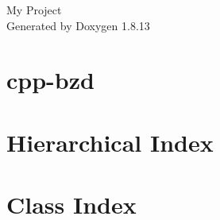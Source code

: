\documentclass[twoside]{book}
\newcommand{\+}{\discretionary{\mbox{\scriptsize$\hookleftarrow$}}{}{}}
\newcommand{\clearemptydoublepage}{%
  \newpage{\pagestyle{empty}\cleardoublepage}%
}
\begin{document}
\hypersetup{pageanchor=false,
             bookmarksnumbered=true,
             pdfencoding=unicode
            }
\begin{titlepage}
\vspace*{7cm}
\begin{center}%
{\Large My Project }\\
\vspace*{1cm}
{\large Generated by Doxygen 1.8.13}\\
\end{center}
\end{titlepage}
\clearemptydoublepage
{}
\tableofcontents
\clearemptydoublepage
{}
\hypersetup{pageanchor=true}

\chapter{cpp-\/bzd}
\label{md_README}

\chapter{Hierarchical Index}

\chapter{Class Index}

\end{document}
